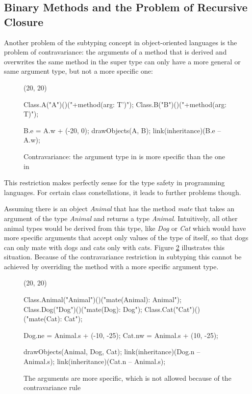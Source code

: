 \subsection{Binary Methods and the Problem of Recursive Closure}
\label{sec:recursiveClosure}
Another problem of the subtyping concept in object-oriented languages is
the problem of contravariance: the arguments of a method that is derived
and overwrites the same method in the super type can only have a more
general or same argument type, but not a more specific one:

\begin{figure}[H]
	\centering
	\begin{emp}[classdiag](20, 20)

		Class.A("A")()("+method(arg: T')");
		Class.B("B")()("+method(arg: T)");

		B.e = A.w + (-20, 0);
		drawObjects(A, B);
		link(inheritance)(B.e -- A.w);

	\end{emp}
	\caption{Contravariance: the argument type in \B is more specific than the one in \A}
	\label{fig:contravariance}
\end{figure}

This restriction makes perfectly sense for the type safety in
programming languages. For certain class constellations, it leads to
further problems though.

Assuming there is an object \emph{Animal} that has the method
\emph{mate} that takes an argument of the type \emph{Animal} and
returns a type \emph{Animal}. Intuitively, all other animal types
would be derived from this type, like \emph{Dog} or \emph{Cat} which
would have more specific arguments that accept only values of the type
of itself, so that dogs can only mate with dogs and cats only with
cats\cite{simons_theory_2003-1}. Figure \ref{fig:animalContravariance}
illustrates this situation. Because of the contravariance restriction
in subtyping this cannot be achieved by overriding the method with a
more specific argument type.

\begin{figure}[H]
	\centering
	\begin{emp}[classdiag](20, 20)

		Class.Animal("Animal")()("mate(Animal): Animal");
		Class.Dog("Dog")()("mate(Dog): Dog");
		Class.Cat("Cat")()("mate(Cat): Cat");

		Dog.ne = Animal.s + (-10, -25);
		Cat.nw = Animal.s + (10, -25);

		drawObjects(Animal, Dog, Cat);
		link(inheritance)(Dog.n -- Animal.s);
		link(inheritance)(Cat.n -- Animal.s);

	\end{emp}
	\caption{The arguments are more specific, which is not allowed because of the contravariance rule}
	\label{fig:animalContravariance}
\end{figure}

